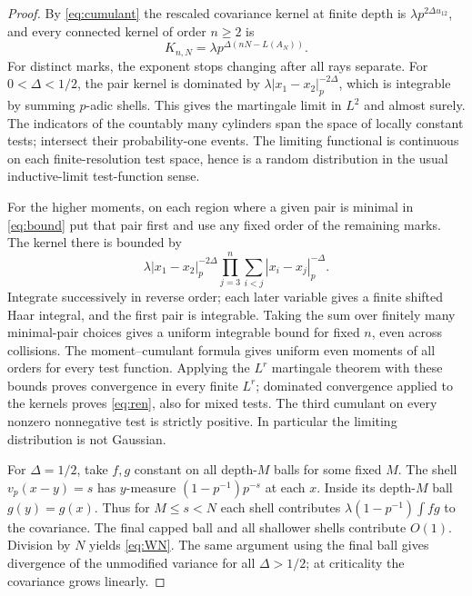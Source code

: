 \documentclass[11pt]{article}
\theoremstyle{remark}
\begin{document}
\begin{proof}
By \eqref{eq:cumulant} the rescaled covariance kernel at finite depth is \(\lambda p^{2\Delta u_{12}}\), and every connected kernel of order \(n\ge2\) is
\begin{equation}\label{eq:cutoff}
 K_{n,N}=\lambda p^{\Delta(nN-L(A_N))}.
\end{equation}
For distinct marks, the exponent stops changing after all rays separate. For \(0<\Delta<1/2\), the pair kernel is dominated by \(\lambda |x_1-x_2|_p^{-2\Delta}\), which is integrable by summing \(p\)-adic shells. This gives the martingale limit in \(L^2\) and almost surely. The indicators of the countably many cylinders span the space of locally constant tests; intersect their probability-one events. The limiting functional is continuous on each finite-resolution test space, hence is a random distribution in the usual inductive-limit test-function sense.

For the higher moments, on each region where a given pair is minimal in \eqref{eq:bound} put that pair first and use any fixed order of the remaining marks. The kernel there is bounded by
\[
 \lambda |x_1-x_2|_p^{-2\Delta}
       \prod_{j=3}^n \sum_{i<j}|x_i-x_j|_p^{-\Delta}.
\]
Integrate successively in reverse order; each later variable gives a finite shifted Haar integral, and the first pair is integrable. Taking the sum over finitely many minimal-pair choices gives a uniform integrable bound for fixed \(n\), even across collisions. The moment--cumulant formula gives uniform even moments of all orders for every test function. Applying the \(L^r\) martingale theorem with these bounds proves convergence in every finite \(L^r\); dominated convergence applied to the kernels proves \eqref{eq:ren}, also for mixed tests. The third cumulant on every nonzero nonnegative test is strictly positive. In particular the limiting distribution is not Gaussian.

For \(\Delta=1/2\), take \(f,g\) constant on all depth-\(M\) balls for some fixed \(M\). The shell \(v_p(x-y)=s\) has \(y\)-measure \((1-p^{-1})p^{-s}\) at each \(x\). Inside its depth-\(M\) ball \(g(y)=g(x)\). Thus for \(M\le s<N\) each shell contributes \(\lambda(1-p^{-1})\int fg\) to the covariance. The final capped ball and all shallower shells contribute \(O(1)\). Division by \(N\) yields \eqref{eq:WN}. The same argument using the final ball gives divergence of the unmodified variance for all \(\Delta>1/2\); at criticality the covariance grows linearly.


\end{proof}
\end{document}
